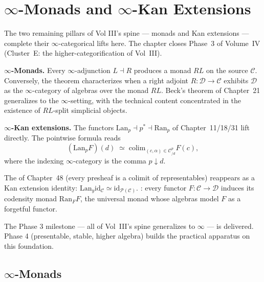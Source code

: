 
\chapter{$\infty$-Monads and $\infty$-Kan Extensions}

\begin{overviewbox}
The two remaining pillars of Vol III's spine — monads and Kan extensions
— complete their $\infty$-categorical lifts here. The chapter closes
Phase~3 of Volume~IV (Cluster~E: the higher-categorification of Vol~III).

\textbf{$\infty$-Monads.} Every $\infty$-adjunction $L \dashv R$ produces
a monad $RL$ on the source $\mathcal{C}$. Conversely, the
 theorem characterizes when a right adjoint
$R : \mathcal{D} \to \mathcal{C}$ exhibits $\mathcal{D}$ as the
$\infty$-category of algebras over the monad $RL$. Beck's theorem of
Chapter~21 generalizes to the $\infty$-setting, with the technical
content concentrated in the existence of $RL$-split simplicial objects.

\textbf{$\infty$-Kan extensions.} The functors $\mathrm{Lan}_p \dashv p^*
\dashv \mathrm{Ran}_p$ of Chapter~11/18/31 lift directly. The pointwise
formula reads
\begin{equation*}
  (\mathrm{Lan}_p F)(d) \;\simeq\; \mathrm{colim}_{(c, \alpha) \in \mathcal{C}_{/d}^p} F(c),
\end{equation*}
where the indexing $\infty$-category is the comma $p \downarrow d$.

The  of Chapter~48 (every presheaf is a colimit
of representables) reappears as a Kan extension identity:
$\mathrm{Lan}_y \mathrm{id}_\mathcal{C} \simeq \mathrm{id}_{\mathcal{P}(\mathcal{C})}$.
: every functor $F : \mathcal{C} \to \mathcal{D}$ induces
its codensity monad $\mathrm{Ran}_F F$, the universal monad whose
algebras model $F$ as a forgetful functor.

The Phase 3 milestone — all of Vol~III's spine generalizes to $\infty$ —
is delivered. Phase 4 (presentable, stable, higher algebra) builds the
practical apparatus on this foundation.
\end{overviewbox}


\section{$\infty$-Monads}
\label{sec:infty-monads}

